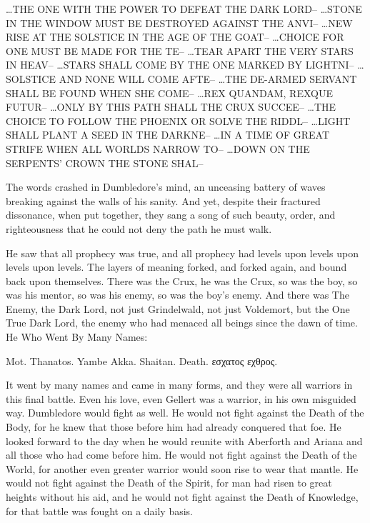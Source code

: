 
…THE ONE WITH THE POWER TO DEFEAT THE DARK LORD–
…STONE IN THE WINDOW MUST BE DESTROYED AGAINST THE ANVI–
…NEW RISE AT THE SOLSTICE IN THE AGE OF THE GOAT–
…CHOICE FOR ONE MUST BE MADE FOR THE TE–
…TEAR APART THE VERY STARS IN HEAV–
…STARS SHALL COME BY THE ONE MARKED BY LIGHTNI–
…SOLSTICE AND NONE WILL COME AFTE–
…THE DE-ARMED SERVANT SHALL BE FOUND WHEN SHE COME–
…REX QUANDAM, REXQUE FUTUR–
…ONLY BY THIS PATH SHALL THE CRUX SUCCEE–
…THE CHOICE TO FOLLOW THE PHOENIX OR SOLVE THE RIDDL–
…LIGHT SHALL PLANT A SEED IN THE DARKNE–
…IN A TIME OF GREAT STRIFE WHEN ALL WORLDS NARROW TO–
…DOWN ON THE SERPENTS’ CROWN THE STONE SHAL–

The words crashed in Dumbledore’s mind, an unceasing battery of waves breaking against the walls of his sanity. And yet, despite their fractured dissonance, when put together, they sang a song of such beauty, order, and righteousness that he could not deny the path he must walk.

He saw that all prophecy was true, and all prophecy had levels upon levels upon levels upon levels. The layers of meaning forked, and forked again, and bound back upon themselves. There was the Crux, he was the Crux, so was the boy, so was his mentor, so was his enemy, so was the boy’s enemy. And there was The Enemy, the Dark Lord, not just Grindelwald, not just Voldemort, but the One True Dark Lord, the enemy who had menaced all beings since the dawn of time. He Who Went By Many Names:

Mot. Thanatos. Yambe Akka. Shaitan. Death. εσχατος εχθρος.

It went by many names and came in many forms, and they were all warriors in this final battle. Even his love, even Gellert was a warrior, in his own misguided way. Dumbledore would fight as well. He would not fight against the Death of the Body, for he knew that those before him had already conquered that foe. He looked forward to the day when he would reunite with Aberforth and Ariana and all those who had come before him. He would not fight against the Death of the World, for another even greater warrior would soon rise to wear that mantle. He would not fight against the Death of the Spirit, for man had risen to great heights without his aid, and he would not fight against the Death of Knowledge, for that battle was fought on a daily basis.

